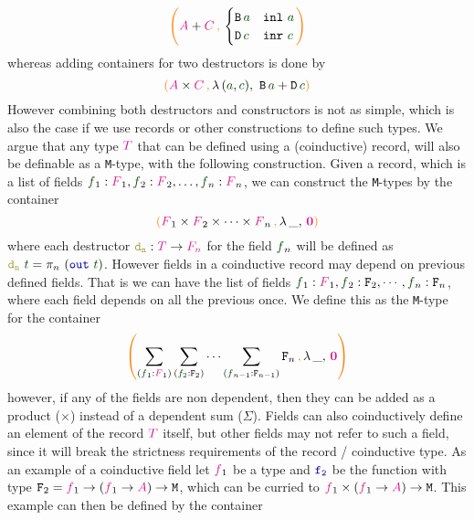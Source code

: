 \documentclass[twoside,11pt,openright]{report}
\theoremstyle{plain} %
\theoremstyle{definition}
\theoremstyle{remark}
\newcommand*{\term}[1]{\textcolor{green!30!black}{#1}} %
\newcommand*{\type}[1]{\textcolor{magenta!90!black}{#1}}
\newcommand*{\containerpair}[2]{\ensuremath{\colorlet{savedleftcolor}{.}\color{orange}\left(\color{savedleftcolor}#1\,\textcolor{orange}{\mathbf{,}}\,#2\color{orange}\right)\color{savedleftcolor}}}
\newcommand*{\containerpairsimple}[2]{\containerpair{#1}{\lambda\,\_,\,#2}}
\newcommand*{\empt}{\type{\textbf{0}}}
\newcommand*{\function}[1]{\textcolor{blue!60!black}{\ensuremath{\mathtt{#1}}}}
\newcommand*{\destructor}[1]{\textcolor{yellow!60!black}{\ensuremath{\mathtt{#1}}}}
\newcommand*{\typeformer}[1]{\ensuremath{\mathtt{#1}}}
\begin{document}
\begin{equation}
  \containerpair{\type{A} + \type{C}}{ \begin{cases} \typeformer{B}\,\term{a} & \mathtt{inl}~\term{a} \\ \typeformer{D}\,\term{c} & \mathtt{inr}~\term{c} \end{cases}}
\end{equation}
whereas adding containers for two destructors is done by
\begin{equation}
  \containerpair{\type{A} \times \type{C}}{\lambda\,(\term{a},\term{c}),~\typeformer{B}\,\term{a} + \typeformer{D}\,\term{c}}  
\end{equation}
However combining both destructors and constructors is not as simple, which is also the case if we use records or other constructions to define such types. We argue that any type \(\type{T}\) that can be defined using a (coinductive) record, will also be definable as a \texttt{M}-type, with the following construction. Given a record, which is a list of fields \(\term{f}_1 : \type{F}_1,\term{f}_2 : \type{F}_2,\dots,\term{f}_n : \type{F}_n\), we can construct the \texttt{M}-types by the container
\begin{equation}
  \containerpairsimple{\type{F}_1 \times \type{F}_2 \times \dots \times \type{F}_n}{\empt}
\end{equation}
where each destructor \(\destructor{d_n} : \type{T} \rightarrow \type{F_n}\) for the field \(\term{f}_n\) will be defined as \(\destructor{d_n}~\term{t} = \pi_n~(\function{out}~\term{t})\). However fields in a coinductive record may depend on previous defined fields. That is we can have the list of fields \(\term{f}_1 : \type{F}_1,\term{f}_2 : \typeformer{F}_2,\cdots,\term{f}_n : \typeformer{F}_n\), where each field depends on all the previous once. We define this as the \texttt{M}-type for the container
\begin{equation}
  \containerpairsimple{\sum_{(\term{f}_1 : \type{F}_1)} \sum_{(\term{f_2} : \typeformer{F}_2)} \cdots \sum_{(\term{f}_{n-1} : \typeformer{F}_{n-1})}\typeformer{F}_n}{\empt}
\end{equation}
however, if any of the fields are non dependent, then they can be added as a product (\(\times\)) instead of a dependent sum (\(\Sigma\)). Fields can also coinductively define an element of the record \(\type{T}\) itself, but other fields may not refer to such a field, since it will break the strictness requirements of the record / coinductive type. As an example of a coinductive field let \(\type{f}_1\) be a type and \(\function{f_2}\) be the function with type \(\typeformer{F}_2 = \type{f}_1 \rightarrow (\type{f}_1 \rightarrow \type{A}) \rightarrow \typeformer{M}\), which can be curried to \(\type{f}_1 \times (\type{f}_1 \rightarrow \type{A}) \rightarrow \typeformer{M}\). This example can then be defined by the container
\end{document}

